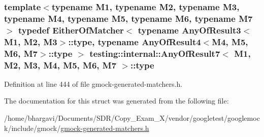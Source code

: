 \subsubsection[{\texorpdfstring{type}{type}}]{\setlength{\rightskip}{0pt plus 5cm}template$<$typename M1, typename M2, typename M3, typename M4, typename M5, typename M6, typename M7$>$ typedef {\bf Either\+Of\+Matcher}$<$ typename {\bf Any\+Of\+Result3}$<$M1, M2, M3$>$\+::{\bf type}, typename {\bf Any\+Of\+Result4}$<$M4, M5, M6, M7$>$\+::{\bf type} $>$ {\bf testing\+::internal\+::\+Any\+Of\+Result7}$<$ M1, M2, M3, M4, M5, M6, M7 $>$\+::{\bf type}}\hypertarget{structtesting_1_1internal_1_1_any_of_result7_a976873478921520833464a86f840abe8}{}\label{structtesting_1_1internal_1_1_any_of_result7_a976873478921520833464a86f840abe8}


Definition at line 444 of file gmock-\/generated-\/matchers.\+h.



The documentation for this struct was generated from the following file\+:\begin{DoxyCompactItemize}
\item 
/home/bhargavi/\+Documents/\+S\+D\+R/\+Copy\+\_\+\+Exam\+\_\+X/vendor/googletest/googlemock/include/gmock/\hyperlink{gmock-generated-matchers_8h}{gmock-\/generated-\/matchers.\+h}\end{DoxyCompactItemize}
